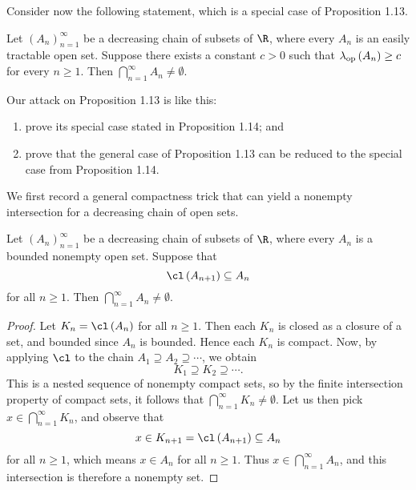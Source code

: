 \documentclass[pmath450]{subfiles}
\begin{document}
    \np Consider now the following statement, which is a special case of Proposition 1.13.

    \begin{prop}{}
        Let $\left( A_{n} \right)^{\infty}_{n=1}$ be a decreasing chain of subsets of $\R$, where every $A_n$ is an easily tractable open set. Suppose there exists a constant $c>0$ such that $\lambda_{\operatorname{op}}\left( A_n \right)\geq c$ for every $n\geq 1$. Then $\bigcap^{\infty}_{n=1}A_n\neq\emptyset$.
    \end{prop}

    \rruleline

    \np Our attack on Proposition 1.13 is like this:
    \begin{enumerate}
        \item prove its special case stated in Proposition 1.14; and
        \item prove that the general case of Proposition 1.13 can be reduced to the special case from Proposition 1.14.
    \end{enumerate}
    We first record a general compactness trick that can yield a nonempty intersection for a decreasing chain of open sets. 

    \begin{lemma}{}
        Let $\left( A_{n} \right)^{\infty}_{n=1}$ be a decreasing chain of subsets of $\R$, where every $A_n$ is a bounded nonempty open set. Suppose that
        \begin{equation*}
            \cl\left( A_{n+1} \right)\subseteq A_n
        \end{equation*}
        for all $n\geq 1$. Then $\bigcap^{\infty}_{n=1}A_n\neq\emptyset$.
    \end{lemma}

    \begin{proof}
        Let $K_n=\cl\left( A_n \right)$ for all $n\geq 1$. Then each $K_n$ is closed as a closure of a set, and bounded since $A_n$ is bounded. Hence each $K_n$ is compact. Now, by applying $\cl$ to the chain $A_1\supseteq A_2\supseteq\cdots$, we obtain
        \begin{equation*}
            K_1\supseteq K_2\supseteq\cdots.
        \end{equation*}
        This is a nested sequence of nonempty compact sets, so by the finite intersection property of compact sets, it follows that $\bigcap^{\infty}_{n=1}K_n\neq\emptyset$. Let us then pick $x\in \bigcap^{\infty}_{n=1}K_n$, and observe that
        \begin{equation*}
            x\in K_{n+1} = \cl\left( A_{n+1} \right)\subseteq A_n
        \end{equation*}
        for all $n\geq 1$, which means $x\in A_n$ for all $n\geq 1$. Thus $x\in \bigcap^{\infty}_{n=1}A_n$, and this intersection is therefore a nonempty set.
    \end{proof}
\end{document}

